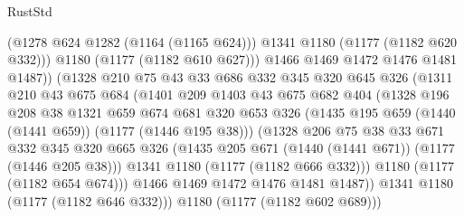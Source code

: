 \begin{lexlean}{RustStd}
\begin{coremodule}
                            (@1278 @624 @1282 (@1164 (@1165 @624)))
                            @1341
                            @1180
                            (@1177 (@1182 @620 @332)))
                          @1180
                          (@1177 (@1182 @610 @627)))
                        @1466
                        @1469
                        @1472
                        @1476
                        @1481
                        @1487))
                    (@1328
                      @210
                      @75
                      @43
                      @33
                      @686
                      @332
                      @345
                      @320
                      @645
                      @326
                      (@1311
                        @210
                        @43
                        @675
                        @684
                        (@1401
                          @209
                          @1403
                          @43
                          @675
                          @682
                          @404
                          (@1328
                            @196
                            @208
                            @38
                            @1321
                            @659
                            @674
                            @681
                            @320
                            @653
                            @326
                            (@1435 @195 @659 (@1440 (@1441 @659)) (@1177 (@1446 @195 @38)))
                            (@1328
                              @206
                              @75
                              @38
                              @33
                              @671
                              @332
                              @345
                              @320
                              @665
                              @326
                              (@1435 @205 @671 (@1440 (@1441 @671)) (@1177 (@1446 @205 @38)))
                              @1341
                              @1180
                              (@1177 (@1182 @666 @332)))
                            @1180
                            (@1177 (@1182 @654 @674)))
                          @1466
                          @1469
                          @1472
                          @1476
                          @1481
                          @1487))
                      @1341
                      @1180
                      (@1177 (@1182 @646 @332)))
                    @1180
                    (@1177 (@1182 @602 @689)))

\end{coremodule}
\end{lexlean}
